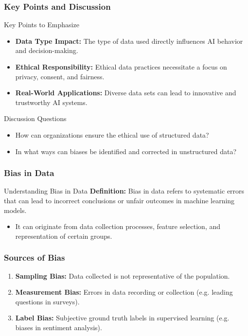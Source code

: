 \documentclass[aspectratio=169]{beamer}
\begin{document}
\begin{frame}[fragile]
    \frametitle{Key Points and Discussion}
    \begin{block}{Key Points to Emphasize}
        \begin{itemize}
            \item \textbf{Data Type Impact:} The type of data used directly influences AI behavior and decision-making.
            \item \textbf{Ethical Responsibility:} Ethical data practices necessitate a focus on privacy, consent, and fairness.
            \item \textbf{Real-World Applications:} Diverse data sets can lead to innovative and trustworthy AI systems.
        \end{itemize}
    \end{block}
    
    \begin{block}{Discussion Questions}
        \begin{itemize}
            \item How can organizations ensure the ethical use of structured data?
            \item In what ways can biases be identified and corrected in unstructured data?
        \end{itemize}
    \end{block}
\end{frame}

\begin{frame}[fragile]
    \frametitle{Bias in Data}
    \begin{block}{Understanding Bias in Data}
        \textbf{Definition:} Bias in data refers to systematic errors that can lead to incorrect conclusions or unfair outcomes in machine learning models.
    \end{block}
    \begin{itemize}
        \item It can originate from data collection processes, feature selection, and representation of certain groups.
    \end{itemize}
\end{frame}

\begin{frame}[fragile]
    \frametitle{Sources of Bias}
    \begin{enumerate}
        \item \textbf{Sampling Bias:} Data collected is not representative of the population.
        \item \textbf{Measurement Bias:} Errors in data recording or collection (e.g. leading questions in surveys).
        \item \textbf{Label Bias:} Subjective ground truth labels in supervised learning (e.g. biases in sentiment analysis).
    \end{enumerate}
\end{frame}
\end{document}

